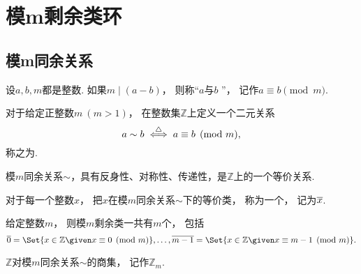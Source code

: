 \section{模m剩余类环}
\subsection{模m同余关系}
\begin{definition}
设\(a,b,m\)都是整数.
如果\(m\mid(a-b)\)，
则称“\(a\)与\(b\) ”，
记作\(a\equiv b\pmod m\).
\end{definition}
\begin{definition}
对于给定正整数\(m\ (m>1)\)，
在整数集\(\mathbb{Z}\)上定义一个二元关系\begin{equation*}
	a \sim b
	\overset{\triangle}{\iff}
	a\equiv b\pmod m,
\end{equation*}
称之为.
\end{definition}
\begin{theorem}
模\(m\)同余关系\(\sim\)，具有反身性、对称性、传递性，是\(\mathbb{Z}\)上的一个等价关系.
\end{theorem}
\begin{definition}
对于每一个整数\(x\)，
把\(x\)在模\(m\)同余关系\(\sim\)下的等价类，
称为一个，
记为\(\EquivalenceClassO{x}\).
\end{definition}
\begin{proposition}
给定整数\(m\)，
则模\(m\)剩余类一共有\(m\)个，
包括\begin{equation*}
	\EquivalenceClassO{0}
	= \Set{ x\in\mathbb{Z} \given x\equiv0\pmod m },
	\dotsc,
	\EquivalenceClassO{m-1}
	= \Set{ x\in\mathbb{Z} \given x\equiv m-1\pmod m }.
\end{equation*}
\end{proposition}
\begin{definition}
\(\mathbb{Z}\)对模\(m\)同余关系\(\sim\)的商集，
记作\(\mathbb{Z}_m\).
\end{definition}

